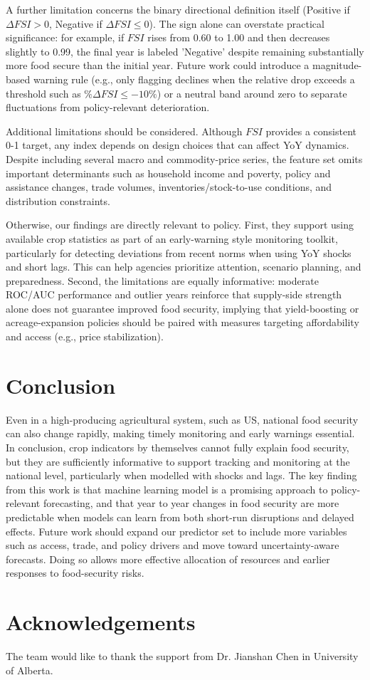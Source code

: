 \documentclass[10pt,twocolumn,letterpaper]{article}
\begin{document}
A further limitation concerns the binary directional definition itself (Positive if $\Delta FSI>0$, Negative if $\Delta FSI\le 0$). The sign alone can overstate practical significance: for example, if $FSI$ rises from 0.60 to 1.00 and then decreases slightly to 0.99, the final year is labeled 'Negative' despite remaining substantially more food secure than the initial year. Future work could introduce a magnitude-based warning rule (e.g., only flagging declines when the relative drop exceeds a threshold such as $\%\Delta FSI \le -10\%$) or a neutral band around zero to separate fluctuations from policy-relevant deterioration.

Additional limitations should be considered. Although $FSI$ provides a consistent 0-1 target, any index depends on design choices that can affect YoY dynamics. Despite including several macro and commodity-price series, the feature set omits important determinants such as household income and poverty, policy and assistance changes, trade volumes, inventories/stock-to-use conditions, and distribution constraints.

Otherwise, our findings are directly relevant to policy. First, they support using available crop statistics as part of an early-warning style monitoring toolkit, particularly for detecting deviations from recent norms when using YoY shocks and short lags. This can help agencies prioritize attention, scenario planning, and preparedness. Second, the limitations are equally informative: moderate ROC/AUC performance and outlier years reinforce that supply-side strength alone does not guarantee improved food security, implying that yield-boosting or acreage-expansion policies should be paired with measures targeting affordability and access (e.g., price stabilization).

\section{Conclusion}
Even in a high-producing agricultural system, such as US, national food security can also change rapidly, making timely monitoring and early warnings essential. In conclusion, crop indicators by themselves cannot fully explain food security, but they are sufficiently informative to support tracking and monitoring at the national level, particularly when modelled with shocks and lags. The key finding from this work is that machine learning model is a promising approach to policy-relevant forecasting, and that year to year changes in food security are more predictable when models can learn from both short-run disruptions and delayed effects. Future work should expand our predictor set to include more variables such as access, trade, and policy drivers and move toward uncertainty-aware forecasts. Doing so allows more effective allocation of resources and earlier responses to food-security risks. 

\nocite{*}

\section*{Acknowledgements}
The team would like to thank the support from Dr. Jianshan Chen in University of Alberta. 


\end{document}

